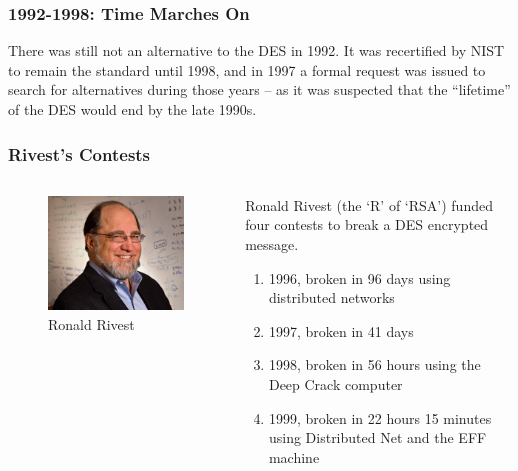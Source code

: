 \documentclass{beamer}
\newcommand{\<}{\langle}
\renewcommand{\>}{\rangle}
\begin{document}
\begin{frame}
\frametitle{1992-1998: Time Marches On}

There was still not an alternative to the DES in 1992. It was recertified by NIST to remain the standard until 1998, and in 1997 a formal request was issued to search for alternatives during those years -- as it was suspected that the ``lifetime'' of the DES would end by the late 1990s.
\end{frame}



\begin{frame}
\frametitle{Rivest's Contests}

\begin{columns}
\begin{column}{.3\textwidth}
\begin{figure}
\includegraphics[scale=.28]{IMG/rivest}
\caption{\scriptsize Ronald Rivest}
\end{figure}
\end{column}

\begin{column}{.67\textwidth}\small
Ronald Rivest (the `R' of `RSA') funded four contests to break a DES encrypted message.
\begin{enumerate}[(Contest 1)]
\item 1996, broken in 96 days using distributed networks
\item 1997, broken in 41 days
\item 1998, broken in 56 hours using the Deep Crack computer
\item 1999, broken in 22 hours 15 minutes using Distributed Net and the EFF machine
\end{enumerate}
\end{column}
\end{columns}
\end{frame}
\end{document}
